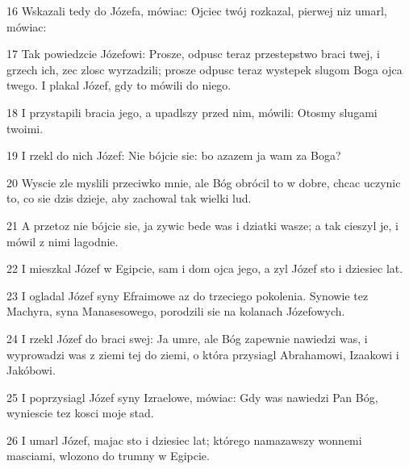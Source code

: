 \par 16 Wskazali tedy do Józefa, mówiac: Ojciec twój rozkazal, pierwej niz umarl, mówiac:
\par 17 Tak powiedzcie Józefowi: Prosze, odpusc teraz przestepstwo braci twej, i grzech ich, zec zlosc wyrzadzili; prosze odpusc teraz wystepek slugom Boga ojca twego. I plakal Józef, gdy to mówili do niego.
\par 18 I przystapili bracia jego, a upadlszy przed nim, mówili: Otosmy slugami twoimi.
\par 19 I rzekl do nich Józef: Nie bójcie sie: bo azazem ja wam za Boga?
\par 20 Wyscie zle myslili przeciwko mnie, ale Bóg obrócil to w dobre, chcac uczynic to, co sie dzis dzieje, aby zachowal tak wielki lud.
\par 21 A przetoz nie bójcie sie, ja zywic bede was i dziatki wasze; a tak cieszyl je, i mówil z nimi lagodnie.
\par 22 I mieszkal Józef w Egipcie, sam i dom ojca jego, a zyl Józef sto i dziesiec lat.
\par 23 I ogladal Józef syny Efraimowe az do trzeciego pokolenia. Synowie tez Machyra, syna Manasesowego, porodzili sie na kolanach Józefowych.
\par 24 I rzekl Józef do braci swej: Ja umre, ale Bóg zapewnie nawiedzi was, i wyprowadzi was z ziemi tej do ziemi, o która przysiagl Abrahamowi, Izaakowi i Jakóbowi.
\par 25 I poprzysiagl Józef syny Izraelowe, mówiac: Gdy was nawiedzi Pan Bóg, wyniescie tez kosci moje stad.
\par 26 I umarl Józef, majac sto i dziesiec lat; którego namazawszy wonnemi masciami, wlozono do trumny w Egipcie.


